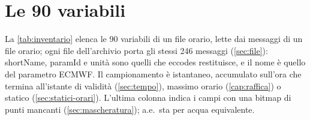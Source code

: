 \chapter{Le 90 variabili}
\label{app:variabili}

La \cref{tab:inventario} elenca le 90 variabili di un file orario, lette dai messaggi di un file
orario; ogni file dell'archivio porta gli stessi 246 messaggi (\cref{sec:file}): shortName, paramId e unità sono quelli che eccodes restituisce, e il nome è quello
del parametro ECMWF. Il campionamento è istantaneo, accumulato sull'ora che termina all'istante di validità (\cref{sec:tempo}),
massimo orario (\cref{cap:raffica}) o statico (\cref{sec:statici-orari}). L'ultima colonna indica
i campi con una bitmap di punti mancanti (\cref{sec:mascheratura}); a.e.\ sta per acqua equivalente.

